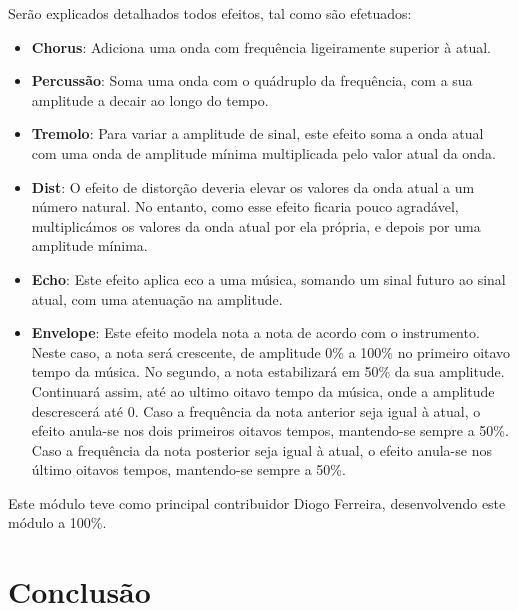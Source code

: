 \documentclass[11pt,openany,twoside]{report}
\begin{document}
Serão explicados detalhados todos efeitos, tal como são efetuados:
\begin{itemize}
\item \textbf{Chorus}: Adiciona uma onda com frequência ligeiramente superior à atual. 
\item \textbf{Percussão}: Soma uma onda com o quádruplo da frequência, com a sua amplitude a decair ao longo do tempo. 
\item \textbf{Tremolo}: Para variar a amplitude de sinal, este efeito soma a onda atual com uma onda de amplitude mínima multiplicada pelo valor atual da onda. 
\item \textbf{Dist}: O efeito de distorção deveria elevar os valores da onda atual a um número natural. No entanto, como esse efeito ficaria pouco agradável, multiplicámos os valores da onda atual por ela própria, e depois por uma amplitude mínima. 
\item \textbf{Echo}: Este efeito aplica eco a uma música, somando um sinal futuro ao sinal atual, com uma atenuação na amplitude. 
\item \textbf{Envelope}: Este efeito modela nota a nota de acordo com o instrumento. Neste caso, a nota será crescente, de amplitude 0\% a 100\% no primeiro oitavo tempo da música. No segundo, a nota estabilizará em 50\% da sua amplitude. Continuará assim, até ao ultimo oitavo tempo da música, onde a amplitude descrescerá até 0. Caso a frequência da nota anterior seja igual à atual, o efeito anula-se nos dois primeiros oitavos tempos, mantendo-se sempre a 50\%. Caso a frequência da nota posterior seja igual à atual, o efeito anula-se nos último oitavos tempos, mantendo-se sempre a 50\%.

\end{itemize}

Este módulo teve como principal contribuidor Diogo Ferreira, desenvolvendo este módulo a 100\%.

\part{Conclusão}
\end{document}
